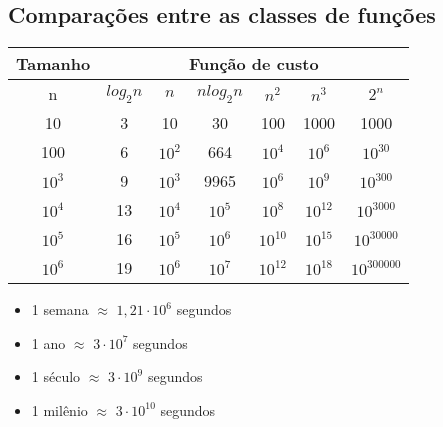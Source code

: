 \subsection{Comparações entre as classes de funções}

\small 

\begin{table}[!ht]
\begin{tabular}{ccccccc}
Tamanho & \multicolumn{6}{c}{Função de custo}                             \\
\hline
n       & $log_2n$ & $n$    & $nlog_2n$ & $n^2$   & $n^3$   & $2^n$       \\
\hline
10      & 3        & 10     & 30        & 100     & 1000    & 1000        \\
100     & 6        & $10^2$ & 664       & $10^4$  & $10^6$  & $10^30$     \\
$10^3$  & 9        & $10^3$ & 9965      & $10^6$  & $10^9$  & $10^300$    \\
$10^4$  & 13       & $10^4$ & $10^5$    & $10^8$  & $10^12$ & $10^3000$   \\
$10^5$  & 16       & $10^5$ & $10^6$    & $10^10$ & $10^15$ & $10^30000$  \\
$10^6$  & 19       & $10^6$ & $10^7$    & $10^12$ & $10^18$ & $10^300000$
\end{tabular}
\end{table}


\begin{itemize}
\item 1 semana $\approx$ $1,21\cdot 10^6$ segundos\\
\item 1 ano $\approx$ $3\cdot 10^7$ segundos\\
\item 1 século $\approx$ $3\cdot 10^9$ segundos\\
\item 1 milênio $\approx$ $3\cdot 10^{10}$ segundos\\
\end{itemize}


